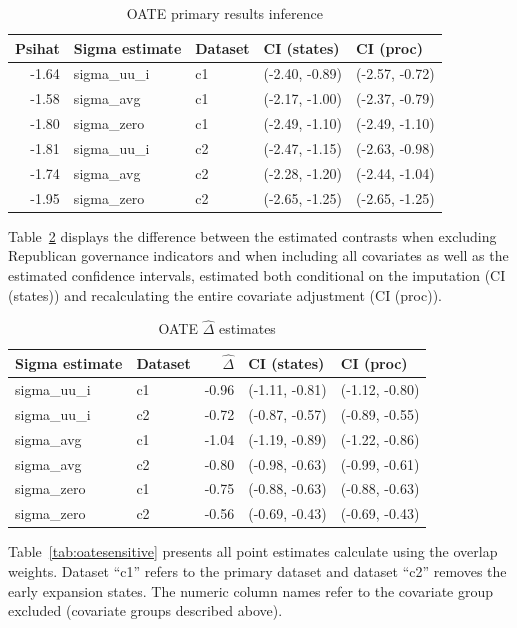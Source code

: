\documentclass{article}
\begin{document}
\begin{appendix}
\begin{table}[ht]
\centering
\caption{OATE primary results inference}
\label{tab:oateconfint}
\begin{tabular}{rllll}
  \hline
Psihat & Sigma estimate & Dataset & CI (states) & CI (proc) \\ 
  \hline
-1.64 & sigma\_uu\_i & c1 & (-2.40, -0.89) & (-2.57, -0.72) \\ 
  -1.58 & sigma\_avg & c1 & (-2.17, -1.00) & (-2.37, -0.79) \\ 
  -1.80 & sigma\_zero & c1 & (-2.49, -1.10) & (-2.49, -1.10) \\ 
  -1.81 & sigma\_uu\_i & c2 & (-2.47, -1.15) & (-2.63, -0.98) \\ 
  -1.74 & sigma\_avg & c2 & (-2.28, -1.20) & (-2.44, -1.04) \\ 
  -1.95 & sigma\_zero & c2 & (-2.65, -1.25) & (-2.65, -1.25) \\ 
   \hline
\end{tabular}
\end{table}

Table~\ref{tab:oaterepubdiff} displays the difference between the estimated contrasts when excluding Republican governance indicators and when including all covariates as well as the estimated confidence intervals, estimated both conditional on the imputation (CI (states)) and recalculating the entire covariate adjustment (CI (proc)).

\begin{table}[ht]
\centering
\caption{OATE $\hat{\Delta}$ estimates}
\label{tab:oaterepubdiff}
\begin{tabular}{llrll}
  \hline
Sigma estimate & Dataset & $\hat{\Delta}$ & CI (states) & CI (proc) \\ 
  \hline
sigma\_uu\_i & c1 & -0.96 & (-1.11, -0.81) & (-1.12, -0.80) \\ 
  sigma\_uu\_i & c2 & -0.72 & (-0.87, -0.57) & (-0.89, -0.55) \\ 
  sigma\_avg & c1 & -1.04 & (-1.19, -0.89) & (-1.22, -0.86) \\ 
  sigma\_avg & c2 & -0.80 & (-0.98, -0.63) & (-0.99, -0.61) \\ 
  sigma\_zero & c1 & -0.75 & (-0.88, -0.63) & (-0.88, -0.63) \\ 
  sigma\_zero & c2 & -0.56 & (-0.69, -0.43) & (-0.69, -0.43) \\ 
   \hline
\end{tabular}
\end{table}

Table~\ref{tab:oatesensitive} presents all point estimates calculate using the overlap weights. Dataset ``c1'' refers to the primary dataset and dataset ``c2'' removes the early expansion states. The numeric column names refer to the covariate group excluded (covariate groups described above).


\end{appendix}
\end{document}
